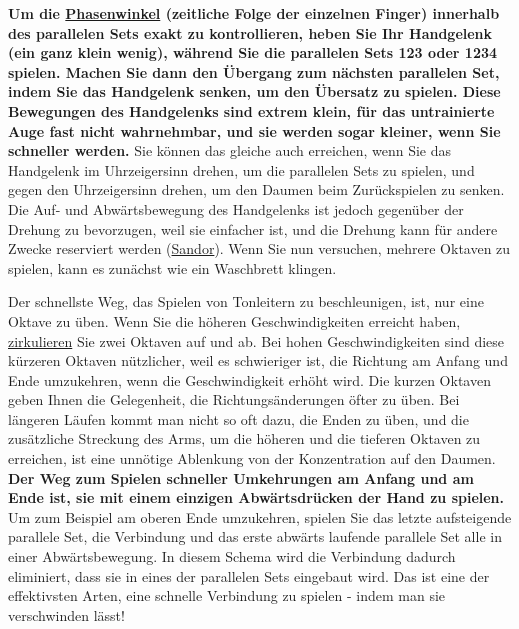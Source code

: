 \textbf{Um die \hyperlink{c1iv2a}{Phasenwinkel} (zeitliche Folge der einzelnen Finger) innerhalb des parallelen Sets exakt zu kontrollieren, heben Sie Ihr Handgelenk (ein ganz klein wenig), während Sie die parallelen Sets 123 oder 1234 spielen.
Machen Sie dann den Übergang zum nächsten parallelen Set, indem Sie das Handgelenk senken, um den Übersatz zu spielen.
Diese Bewegungen des Handgelenks sind extrem klein, für das untrainierte Auge fast nicht wahrnehmbar, und sie werden sogar kleiner, wenn Sie schneller werden.}
Sie können das gleiche auch erreichen, wenn Sie das Handgelenk im Uhrzeigersinn drehen, um die parallelen Sets zu spielen, und gegen den Uhrzeigersinn drehen, um den Daumen beim Zurückspielen zu senken.
Die Auf- und Abwärtsbewegung des Handgelenks ist jedoch gegenüber der Drehung zu bevorzugen, weil sie einfacher ist, und die Drehung kann für andere Zwecke reserviert werden (\hyperlink{Sandor}{Sandor}).
Wenn Sie nun versuchen, mehrere Oktaven zu spielen, kann es zunächst wie ein Waschbrett klingen.

Der schnellste Weg, das Spielen von Tonleitern zu beschleunigen, ist, nur eine Oktave zu üben.
Wenn Sie die höheren Geschwindigkeiten erreicht haben, \hyperlink{c1iii2}{zirkulieren} Sie zwei Oktaven auf und ab.
Bei hohen Geschwindigkeiten sind diese kürzeren Oktaven nützlicher, weil es schwieriger ist, die Richtung am Anfang und Ende umzukehren, wenn die Geschwindigkeit erhöht wird.
Die kurzen Oktaven geben Ihnen die Gelegenheit, die Richtungsänderungen öfter zu üben.
Bei längeren Läufen kommt man nicht so oft dazu, die Enden zu üben, und die zusätzliche Streckung des Arms, um die höheren und die tieferen Oktaven zu erreichen, ist eine unnötige Ablenkung von der Konzentration auf den Daumen.
\textbf{Der Weg zum Spielen schneller Umkehrungen am Anfang und am Ende ist, sie mit einem einzigen Abwärtsdrücken der Hand zu spielen.}
Um zum Beispiel am oberen Ende umzukehren, spielen Sie das letzte aufsteigende parallele Set, die Verbindung und das erste abwärts laufende parallele Set alle in einer Abwärtsbewegung.
In diesem Schema wird die Verbindung dadurch eliminiert, dass sie in eines der parallelen Sets eingebaut wird.
Das ist eine der effektivsten Arten, eine schnelle Verbindung zu spielen - indem man sie verschwinden lässt!

